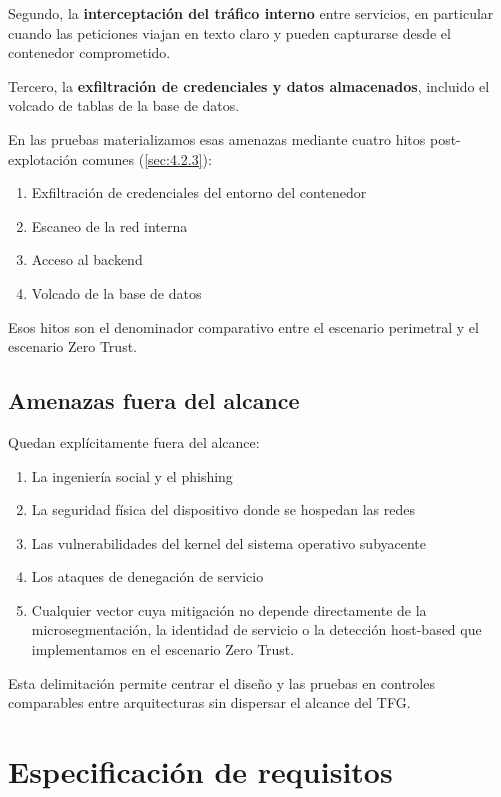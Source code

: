 \documentclass[11pt,spanish,listoffigures,listoftables]{tfgetsinf}
\begin{document}
        Segundo, la \textbf{interceptación del tráfico interno} entre servicios, en particular cuando las peticiones viajan en texto claro y pueden capturarse desde el contenedor comprometido. 
        
        Tercero, la \textbf{exfiltración de credenciales y datos almacenados}, incluido el volcado de tablas de la base de datos.
        
        En las pruebas materializamos esas amenazas mediante cuatro hitos post-explotación comunes (\cref{sec:4.2.3}): 
        \begin{enumerate}
            \item Exfiltración de credenciales del entorno del contenedor
            \item Escaneo de la red interna
            \item Acceso al backend
            \item Volcado de la base de datos
        \end{enumerate}
        Esos hitos son el denominador comparativo entre el escenario perimetral y el escenario Zero Trust.
        
        \subsection{Amenazas fuera del alcance}
        \label{sec:3.2.5}
        Quedan explícitamente fuera del alcance:
        \begin{enumerate}
            \item La ingeniería social y el phishing
            \item La seguridad física del dispositivo donde se hospedan las redes
            \item Las vulnerabilidades del kernel del sistema operativo subyacente
            \item Los ataques de denegación de servicio
            \item Cualquier vector cuya mitigación no depende directamente de la microsegmentación, la identidad de servicio o la detección host-based que implementamos en el escenario Zero Trust.
        \end{enumerate}
        Esta delimitación permite centrar el diseño y las pruebas en controles comparables entre arquitecturas sin dispersar el alcance del TFG.

    \section{Especificación de requisitos}
\end{document}
